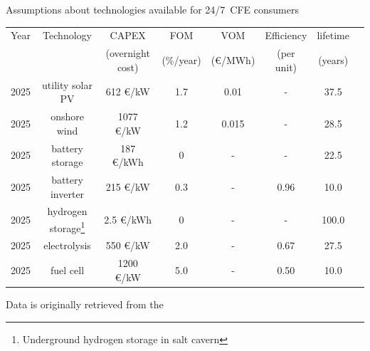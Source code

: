\begin{frame}{Assumptions about technologies available for 24/7~CFE consumers}
  
  \centering
  {\footnotesize 

    \begin{tabular}{cccccccc}
      \hline
      \hline
      Year & Technology & CAPEX & FOM & VOM & Efficiency & lifetime \\
       &  & (overnight cost)  &  (\%/year) &  (€/MWh) & (per unit) & (years) \\
      \hline
      \hline
      2025 & utility solar PV & 612 €/kW & 1.7 & 0.01 & - & 37.5 \\
      \hline
      2025 & onshore wind & 1077 €/kW & 1.2 & 0.015 & - & 28.5 \\
      \hline
      2025 & battery storage & 187 €/kWh & 0 & - & - & 22.5 \\
      \hline
      2025  & battery inverter & 215 €/kW & 0.3 & - & 0.96  & 10.0 \\
      \hline
      2025 & hydrogen storage\footnote{{\scriptsize Underground hydrogen storage in salt cavern}} 
                  & 2.5 €/kWh & 0 & - & - & 100.0 \\
      \hline
      2025 & electrolysis & 550 €/kW & 2.0 & - & 0.67 & 27.5  \\
      \hline
      2025 & fuel cell & 1200 €/kW & 5.0 & - & 0.50 & 10.0 \\
      \hline
      \hline
      \end{tabular}
  
    Data is originally retrieved from the 
      \vspace{0.2cm}
  }
\end{frame}

